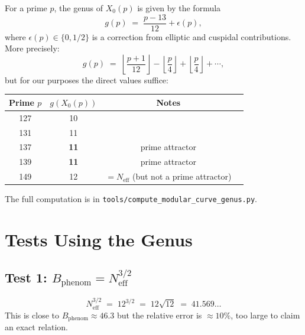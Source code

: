 \documentclass[12pt,a4paper]{article}
\theoremstyle{definition}
\theoremstyle{remark}
\begin{document}
For a prime $p$, the genus of $X_0(p)$ is given by the formula
\begin{equation}
  g(p) \;=\; \frac{p-13}{12} + \epsilon(p),
  \label{eq:genus_prime}
\end{equation}
where $\epsilon(p) \in \{0, 1/2\}$ is a correction from elliptic and
cuspidal contributions.  More precisely:
\begin{equation}
  g(p) \;=\; \left\lfloor\frac{p+1}{12}\right\rfloor
             - \left\lfloor\frac{p}{4}\right\rfloor + \left\lfloor\frac{p}{4}\right\rfloor
             + \cdots,
\end{equation}
but for our purposes the direct values suffice:

\begin{center}
\begin{tabular}{cccc}
  \toprule
  Prime $p$ & $g(X_0(p))$ & Notes \\
  \midrule
  127 & 10 & \\
  131 & 11 & \\
  137 & \textbf{11} & prime attractor \\
  139 & \textbf{11} & prime attractor \\
  149 & 12 & $= N_{\mathrm{eff}}$ (but not a prime attractor) \\
  \bottomrule
\end{tabular}
\end{center}

The full computation is in \texttt{tools/compute\_modular\_curve\_genus.py}.

\section{Tests Using the Genus}
\label{sec:genus_tests}

\subsection{Test 1: $B_{\mathrm{phenom}} = N_{\mathrm{eff}}^{3/2}$}

\begin{equation}
  N_{\mathrm{eff}}^{3/2} \;=\; 12^{3/2} \;=\; 12\sqrt{12}
    \;=\; 41.569\ldots
\end{equation}
This is close to $B_{\mathrm{phenom}} \approx 46.3$ but the relative
error is $\approx 10\%$, too large to claim an exact relation.
\end{document}
